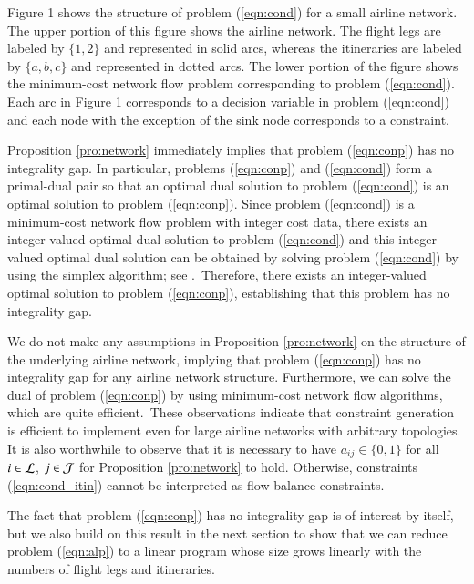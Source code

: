 Figure 1 shows the structure of problem (\ref{eqn:cond}) for a small airline network. The upper portion of this figure shows the airline network. The flight legs are labeled by $\{1,2\}$ and represented in solid arcs, whereas the itineraries are labeled by $\{a,b,c\}$ and represented in dotted arcs. The lower portion of the figure shows the minimum-cost network flow problem corresponding to problem (\ref{eqn:cond}). Each arc in Figure 1 corresponds to a decision variable in problem (\ref{eqn:cond}) and each node with the exception of the sink node corresponds to a constraint.


Proposition \ref{pro:network} immediately implies that problem (\ref{eqn:conp}) has no integrality gap. In particular, problems (\ref{eqn:conp}) and (\ref{eqn:cond}) form a primal-dual pair so that an optimal dual solution to problem (\ref{eqn:cond}) is an optimal solution to problem (\ref{eqn:conp}). Since problem (\ref{eqn:cond}) is a minimum-cost network flow problem with integer cost data, there exists an integer-valued optimal dual solution to problem (\ref{eqn:cond}) and this integer-valued optimal dual solution can be obtained by solving problem (\ref{eqn:cond}) by using the simplex algorithm; see .~Therefore, there exists an integer-valued optimal solution to problem (\ref{eqn:conp}), establishing that this problem has no integrality gap.

We do not make any assumptions in Proposition \ref{pro:network} on the structure of the underlying airline network, implying that problem (\ref{eqn:conp}) has no integrality gap for any airline network structure. Furthermore, we can solve the dual of problem (\ref{eqn:conp}) by using minimum-cost network flow algorithms, which are quite efficient.~These observations indicate that constraint generation is efficient to implement even for large airline networks with arbitrary topologies. It is also worthwhile to observe that it is necessary to have $a_{ij} \in \{0,1\}$ for all $i \in {\cal L}$, $j \in {\cal J}$ for Proposition \ref{pro:network} to hold. Otherwise, constraints (\ref{eqn:cond_itin}) cannot be interpreted as flow balance constraints.


The fact that problem (\ref{eqn:conp}) has no integrality gap is of interest by itself, but we also build on this result in the next section to show that we can reduce problem (\ref{eqn:alp}) to a linear program whose size grows linearly with the numbers of flight legs and itineraries. 



